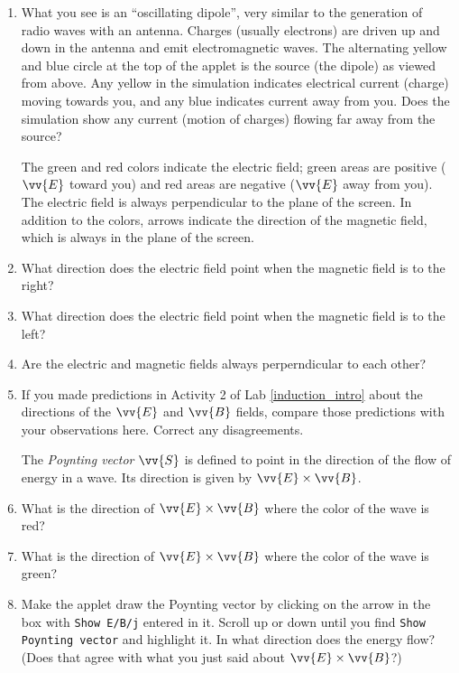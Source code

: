 \begin{enumerate}[labparts]

\item What you see is an ``oscillating dipole'', very similar to the generation of radio waves with an antenna.
Charges (usually electrons) are driven up and down in the antenna and emit electromagnetic 
waves.  
The alternating yellow and blue circle at the top of the applet is the source (the dipole)
as viewed from above.  Any yellow in the simulation indicates electrical current (charge) moving towards you, and any blue indicates current away from you.  Does the simulation show any current (motion of charges) flowing far away from the source?
\answerspace{1.0cm}

\pagebreak[2]
The green and red colors indicate the electric field; green areas are positive 
($\vv{E}$ toward you) and red areas are negative ($\vv{E}$ away from you). 
The electric field is always perpendicular to the plane of the screen.
In addition to the colors, arrows indicate the 
direction of the magnetic field, which is always in the plane of the screen.  

\item What direction does the electric field point when the magnetic field is to the right?
\answerspace{0.6cm}

\item What direction does the electric field point when the magnetic field is to the left?
\answerspace{0.6cm}

\item Are the electric and magnetic fields always perperndicular to each other?
\answerspace{0.6cm}

\item If you made predictions in Activity 2 of Lab \ref{induction_intro} about the directions of the $\vv {E}$ 
and $\vv {B}$ fields, compare those predictions with your observations here. Correct any disagreements.
\answerspace{2.0cm}

The \textit{Poynting vector} $\vv{S}$ is defined to point in the direction of the flow of energy in a wave. Its direction is given by $\vv {E} \times \vv {B}$.  

\item What is the direction of $\vv {E}\times \vv {B}$ where the color of the wave is red?
\answerspace{1.0cm}

\item What is the direction of $\vv {E} \times \vv {B}$ where the color of the wave is green?
\answerspace{1.0cm}

\item Make the applet draw the Poynting vector by clicking on the arrow in the box with 
\texttt{Show E/B/j} entered in it. Scroll up or down until you find
\texttt{Show Poynting vector} and highlight it.
In what direction does the energy flow?  (Does that agree with what you just said about $\vv {E} \times \vv {B}$?)
\answerspace{1.0cm}

\end{enumerate}

